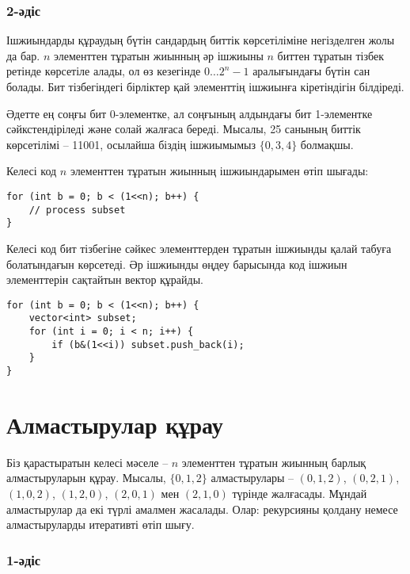 \subsubsection{2-әдіс}

Ішжиындарды құраудың бүтін сандардың биттік көрсетіліміне негізделген жолы да бар. 
$n$ элементтен тұратын жиынның әр ішжиыны $n$ биттен тұратын тізбек ретінде көрсетіле алады,
ол өз кезегінде $0 \ldots 2^n-1$ аралығындағы бүтін сан болады.
Бит тізбегіндегі бірліктер қай элементтің ішжиынға кіретіндігін білдіреді.

Әдетте ең соңғы бит 0-элементке, 
ал соңғының алдындағы бит 1-элементке сәйкстендіріледі 
және солай жалғаса береді.
Мысалы, 25 санының биттік көрсетілімі -- 11001,
осылайша біздің ішжиымымыз $\{0,3,4\}$ болмақшы.

Келесі код $n$ элементтен тұратын жиынның ішжиындарымен өтіп шығады:

\begin{lstlisting}
for (int b = 0; b < (1<<n); b++) {
    // process subset 
}
\end{lstlisting}

Келесі код бит тізбегіне сәйкес элементтерден тұратын ішжиынды
қалай табуға болатындағын көрсетеді. Әр ішжиынды өңдеу барысында 
код ішжиын элементтерін сақтайтын вектор құрайды.

\begin{lstlisting}
for (int b = 0; b < (1<<n); b++) {
    vector<int> subset;
    for (int i = 0; i < n; i++) {
        if (b&(1<<i)) subset.push_back(i);
    }
}
\end{lstlisting}

\section{Алмастырулар құрау}


Біз қарастыратын келесі мәселе -- $n$ элементтен тұратын
жиынның барлық алмастыруларын құрау. Мысалы, $\{0,1,2\}$ алмастырулары --
$(0,1,2)$, $(0,2,1)$, $(1,0,2)$, $(1,2,0)$,
$(2,0,1)$ мен $(2,1,0)$ түрінде жалғасады. Мұндай алмастырулар да екі түрлі амалмен жасалады. Олар:
рекурсияны қолдану немесе алмастыруларды итеративті өтіп шығу.

\subsubsection{1-әдіс}

